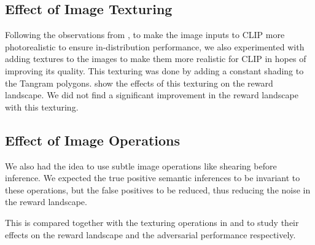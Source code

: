 \subsection{Effect of Image Texturing}
\label{sec:image-texturing}
Following the observations from \cite{vlmrm}, to make the image inputs to CLIP more photorealistic to ensure in-distribution performance, we also experimented with adding textures to the images to make them more realistic for CLIP in hopes of improving its quality.
This texturing was done by adding a constant shading to the Tangram polygons.
 show the effects of this texturing on the reward landscape.
We did not find a significant improvement in the reward landscape with this texturing.

\subsection{Effect of Image Operations}
\label{sec:image-operations}
We also had the idea to use subtle image operations like shearing before inference.
We expected the true positive semantic inferences to be invariant to these operations, but the false positives to be reduced, thus reducing the noise in the reward landscape.

This is compared together with the texturing operations in  and  to study their effects on the reward landscape and the adversarial performance respectively.


